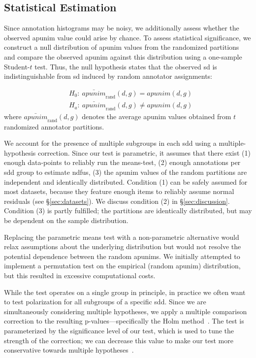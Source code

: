 \documentclass[manuscript,screen,review,anonymous]{acmart}
\theoremstyle{acmplain}
\theoremstyle{researchquestionstyle}
\begin{document}
\subsection{Statistical Estimation}

Since annotation histograms may be noisy, we additionally assess whether the observed apunim value could arise by chance. To assess statistical significance, we construct a null distribution of apunim values from the randomized partitions and compare the observed apunim against this distribution using a one-sample Student-\(t\) test. Thus, the null hypothesis states that the observed \ac{sd} is indistinguishable from \ac{sd} induced by random annotator assignments:

\begin{equation}
	\label{eq:pvalue}
	\begin{split}
		&H_0:\ 
		\bar{\textit{apunim}}_{\mathrm{rand}}(d,g)
		=
		\textit{apunim}(d,g) \\
		&H_a:\ 
		\bar{\textit{apunim}}_{\mathrm{rand}}(d,g)
		\neq
		\textit{apunim}(d,g)
	\end{split}
\end{equation}
\noindent where \(\bar{\textit{apunim}}_{\mathrm{rand}}(d,g)\) denotes the average apunim values obtained from $t$ randomized annotator partitions.

We account for the presence of multiple subgroups in each \ac{sdd} using a multiple-hypothesis correction. Since our test is parametric, it assumes that there exist (1) enough data-points to reliably run the means-test, (2) enough annotations per \ac{sdd} group to estimate \acp{ndfu}, (3) the apunim values of the random partitions are independent and identically distributed. Condition (1) can be safely assumed for most datasets, because they feature enough items to reliably assume normal residuals (see \S\ref{sec:datasets}). We discuss condition (2) in \S\ref{sec:discussion}. Condition (3) is partly fulfilled; the partitions are identically distributed, but may be dependent on the sample distribution. 

Replacing the parametric means test with a non-parametric alternative would relax assumptions about the underlying distribution but would not resolve the potential dependence between the random apunims. We initially attempted to implement a permutation test on the empirical (random apunim) distribution, but this resulted in excessive computational costs.

While the test operates on a single group in principle, in practice we often want to test polarization for all subgroups of a specific \ac{sdd}. Since we are simultaneously considering multiple hypotheses, we apply a multiple comparison correction to the resulting p-values---specifically the Holm method~\citep{holms}. The test is parameterized by the significance level of our test, which is used to tune the strength of the correction; we can decrease this value to make our test more conservative towards multiple hypotheses~\citep{ChenFengYi2017}.
\end{document}
